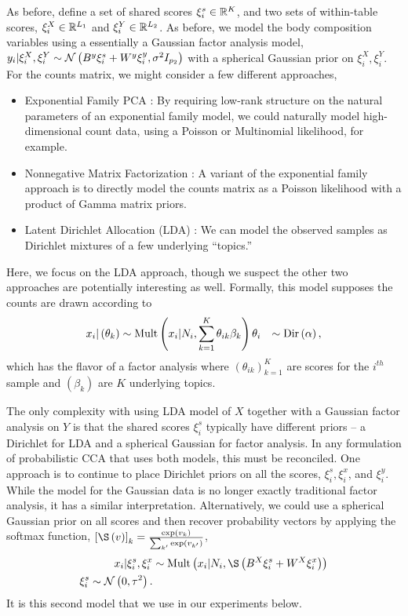 \documentclass{article}
\begin{document}
As before, define a set of shared scores $\xi_{i}^{s} \in \mathbb{R}^{K}$, and two
sets of within-table scores, $\xi_{i}^{X} \in \mathbb{R}^{L_{1}}$ and $\xi_{i}^{Y}
\in \mathbb{R}^{L_{2}}$. As before, we model the body composition variables using a
essentially a Gaussian factor analysis model, $y_{i} \vert \xi_{i}^{X},
\xi_{i}^{Y} \sim \mathcal{N}\left(B^{y}\xi_{i}^s + W^y \xi_{i}^y,
\sigma^{2}I_{p_{2}}\right)$ with a spherical Gaussian prior on $\xi_{i}^{X},
\xi_{i}^{Y}$. For the counts matrix, we might consider a few different
approaches,

\begin{itemize}
\item Exponential Family PCA \citep{mohamed2009bayesian}: By requiring low-rank
  structure on the natural parameters of an exponential family model, we could
  naturally model high-dimensional count data, using a Poisson or Multinomial
  likelihood, for example.
\item Nonnegative Matrix Factorization \citep{lee2001algorithms}: A variant of
  the exponential family approach is to directly model the counts matrix as a
  Poisson likelihood with a product of Gamma matrix priors.
\item Latent Dirichlet Allocation (LDA) \citep{blei2003latent}: We can model the
  observed samples as Dirichlet mixtures of a few underlying ``topics.''
\end{itemize}

Here, we focus on the LDA approach, though we suspect the other two approaches
are potentially interesting as well. Formally, this model supposes the counts
are drawn according to
\begin{align*}
  x_{i} \vert \left(\theta_{k}\right) &\sim \textnormal{Mult}\left(x_{i} \vert N_{i},
  \sum_{k = 1}^{K} \theta_{ik} \beta_{k}\right)
  \theta_{i} &\sim \textnormal{Dir}\left(\alpha\right),
\end{align*}
which has the flavor of a factor analysis where $\left(\theta_{ik}\right)_{k
  =1}^{K}$ are scores for the $i^{th}$ sample and $\left(\beta_{k}\right)$ are
$K$ underlying topics.

The only complexity with using LDA model of $X$ together with a Gaussian factor
analysis on $Y$ is that the shared scores $\xi_{i}^{s}$ typically have different
priors -- a Dirichlet for LDA and a spherical Gaussian for factor analysis. In
any formulation of probabilistic CCA that uses both models, this must be
reconciled. One approach is to continue to place Dirichlet priors on all the
scores, $\xi_{i}^s, \xi_{i}^x$, and $\xi_{i}^y$. While the model for the
Gaussian data is no longer exactly traditional factor analysis, it has a similar
interpretation. Alternatively, we could use a spherical Gaussian prior on all
scores and then recover probability vectors by applying the softmax function,
$\left[\S\left(v\right)\right]_{k} =
\frac{\exp{v_{k}}}{\sum_{k^{\prime}}\exp{v_{k^{\prime}}}}$,
\begin{align*}
  x_{i} \vert \xi_{i}^{s}, \xi_{i}^{x} &\sim \Mult\left(x_{i} \vert N_{i},
  \S\left(B^{X} \xi_{i}^{s} + W^{X} \xi_{i}^{x}\right)\right) \\
  \xi_{i}^{s} \sim \Gsn\left(0, \tau^{2}\right).
\end{align*}
It is this second model that we use in our experiments below.
\end{document}
